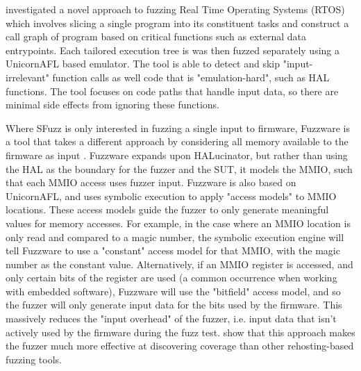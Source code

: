 \documentclass[../report.tex]{subfiles}
\begin{document}
\citet{Chen_2022} investigated a novel approach to fuzzing Real Time Operating
Systems (RTOS) which involves slicing a single program into its constituent
tasks and construct a call graph of program based on critical functions such as
external data entrypoints. Each tailored execution tree is was then fuzzed
separately using a UnicornAFL based emulator. The tool is able to detect and
skip "input-irrelevant" function calls as well code that is "emulation-hard",
such as HAL functions. The tool focuses on code paths that handle input data,
so there are minimal side effects from ignoring these functions.

Where SFuzz is only interested in fuzzing a single input to firmware, Fuzzware
is a tool that takes a different approach by considering all memory available
to the firmware as input \citep{Fuzzware_2022}. Fuzzware expands upon
HALucinator, but rather than using the HAL as the boundary for the fuzzer and
the SUT, it models the MMIO, such that each MMIO access uses fuzzer input.
Fuzzware is also based on UnicornAFL, and uses symbolic execution to apply
"access models" to MMIO locations. These access models guide the fuzzer to only
generate meaningful values for memory accesses. For example, in the case where
an MMIO location is only read and compared to a magic number, the symbolic
execution engine will tell Fuzzware to use a "constant" access model for that
MMIO, with the magic number as the constant value. Alternatively, if an MMIO
register is accessed, and only certain bits of the register are used (a common
occurrence when working with embedded software), Fuzzware will use the
"bitfield" access model, and so the fuzzer will only generate input data for
the bits used by the firmware. This massively reduces the "input overhead" of
the fuzzer, i.e. input data that isn't actively used by the firmware during the
fuzz test. \citet{Fuzzware_2022} show that this approach makes the fuzzer much
more effective at discovering coverage than other rehosting-based fuzzing
tools.
\end{document}

